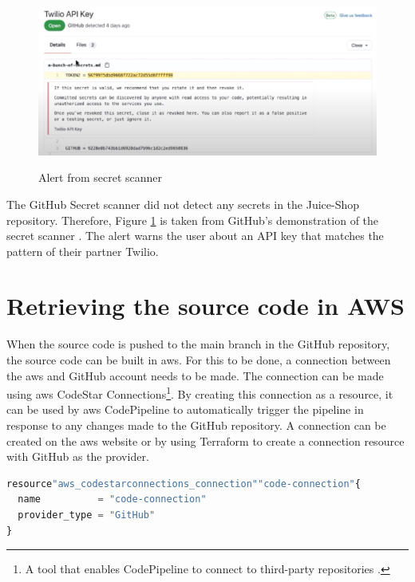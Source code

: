 \vspace{2mm}
\begin{figure}[H]
    \centering
    \includegraphics[width=0.8\columnwidth]{Images/secretscanneralert.png}
    \caption{Alert from secret scanner} \cite{GitHubVideo}
    \label{fig: Alert from secret scanner}
\end{figure}

The GitHub Secret scanner did not detect any secrets in the Juice-Shop repository. Therefore, Figure \ref{fig: Alert from secret scanner} is taken from GitHub's demonstration of the secret scanner \cite{GitHubVideo}. The alert warns the user about an API key that matches the pattern of their partner Twilio. 

\section{Retrieving the source code in AWS}
When the source code is pushed to the main branch in the GitHub repository, the source code can be built in \acrshort{aws}. For this to be done, a connection between the \acrshort{aws} and GitHub account needs to be made. The connection can be made using \acrshort{aws} CodeStar Connections\footnote{A tool that enables CodePipeline to connect to third-party repositories \cite{CodeStarConnections}.}. By creating this connection as a resource, it can be used by \acrshort{aws} CodePipeline to automatically trigger the pipeline in response to any changes made to the GitHub repository. A connection can be created on the \acrshort{aws} website or by using Terraform to create a connection resource with GitHub as the provider.

\vspace{2mm}
\begin{lstlisting}[language=terraform, caption=Create a connection between AWS and GitHub, captionpos=b, frame=single]
resource"aws_codestarconnections_connection""code-connection"{
  name          = "code-connection"
  provider_type = "GitHub" 
}
\end{lstlisting}

